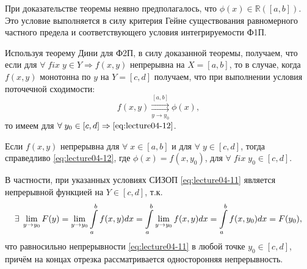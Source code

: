 \begin{notes}
	\item При доказательстве теоремы неявно предполагалось, что $\phi(x) \in \mathbb{R}([a,b])$. Это условие выполняется в силу критерия Гейне существования равномерного частного предела и соответствующего условия интегрируемости Ф1П.
	\item Используя теорему Дини для Ф2П, в силу доказанной теоремы, получаем, что если для $\forall \; fix \; y \in Y \Rightarrow f(x,y)$ непрерывна на $X = [a,b]$, то в случае, когда $f(x,y)$ монотонна по $y$ на $Y = [c,d]$ получаем, что при выполнении условия поточечной сходимости:
	\begin{equation*}
	f(x,y) \underset{y \to y_0}{\overset{[a,b]}{\rightrightarrows}} \phi(x),
	\end{equation*}
	то имеем для $\forall \; y_0 \in [c,d] \Rightarrow \eqref{eq:lecture04-12}$.
	\item Если $f(x,y)$ непрерывна для $\forall \; x \in [a,b]$ и для $\forall \; y \in [c,d]$, тогда справедливо \eqref{eq:lecture04-12}, где $\phi(x) = f(x, y_0)$, для $\forall \; fix \; y_0 \in [c,d]$.

	В частности, при указанных условиях СИЗОП \eqref{eq:lecture04-11} является непрерывной функцией на $Y \in [c,d]$, т.к.
	\begin{equation*}
	\exists \; \lim\limits_{y \to y_0} F(y) = \lim\limits_{y \to y_0} \displaystyle\int\limits_a^b f(x,y)dx = \displaystyle\int\limits_a^b \lim\limits_{y \to y_0} f(x,y)dx= \displaystyle\int\limits_a^b f(x,y_0)dx = F(y_0),
	\end{equation*}
	что равносильно непрерывности \eqref{eq:lecture04-11} в любой точке $y_0 \in [c,d]$, причём на концах отрезка рассматривается односторонняя непрерывность.
\end{notes}

